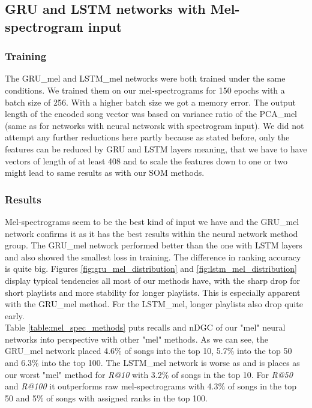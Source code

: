 \subsection{GRU and LSTM networks with Mel-spectrogram input}

\subsubsection{Training}
The GRU\_mel and LSTM\_mel networks were both trained under the same conditions. We trained them on our mel-spectrograms for 150 epochs with a batch size of 256. With a higher batch size we got a memory error. The output length of the encoded song vector was based on variance ratio of the PCA\_mel (same as for networks with neural networsk with spectrogram input). We did not attempt any further reductions here partly because as stated before, only the features can be reduced by GRU and LSTM layers meaning, that we have to have vectors of length of at least 408 and to scale the features down to one or two might lead to same results as with our SOM methods.

\subsubsection{Results}
Mel-spectrograms seem to be the best kind of input we have and the GRU\_mel network confirms it as it has the best results within the neural network method group. The GRU\_mel network performed better than the one with LSTM layers and also showed the smallest loss in training. The difference in ranking accuracy is quite big. Figures \ref{fig:gru_mel_distribution} and \ref{fig:lstm_mel_distribution} display typical tendencies all most of our methods have, with the sharp drop for short playlists and more stability for longer playlists. This is especially apparent with the GRU\_mel method. For the LSTM\_mel, longer playlists also drop quite early. \\
Table \ref{table:mel_spec_methods} puts recalls and nDGC of our "mel" neural networks into perspective with other "mel" methods.
As we can see, the GRU\_mel network placed 4.6\% of songs into the top 10, 5.7\% into the top 50 and 6.3\% into the top 100. The LSTM\_mel network is worse as and is places as our worst "mel" method for \textit{R@10} with 3.2\% of songs in the top 10. For \textit{R@50} and \textit{R@100} it outperforms raw mel-spectrograms with 4.3\% of songs in the top 50 and 5\% of songs with assigned ranks in the top 100.

